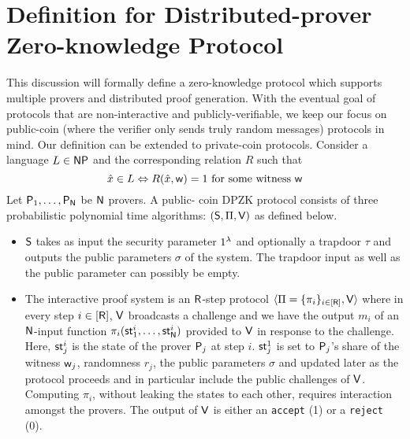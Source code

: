 \section{Definition for Distributed-prover Zero-knowledge Protocol}\label{sec:security model}
This discussion will formally define a zero-knowledge protocol which supports multiple provers and distributed proof generation. With the eventual goal of protocols that are non-interactive and publicly-verifiable,  we keep our focus on  public-coin (where the verifier only sends truly random messages) protocols in mind.  Our definition can be extended to private-coin protocols. Consider a language $L \in \mathsf{NP}$ and the corresponding relation $R$ such that
\[
\hat{x} \in L \Leftrightarrow R(\hat{x}, \mathsf{w})=1 \text{ for some witness } \mathsf{w}
\]
Let $\mathsf{P}_1, \ldots, \mathsf{P}_{\mathsf{N}}$ be $\mathsf{N}$ provers. %
A public- coin DPZK protocol consists of three probabilistic polynomial time algorithms: $(\mathsf{S}, \Pi, \mathsf{V})$ as defined below. 
\begin{itemize}
\item $\mathsf{S}$ takes as input the security parameter $1^{\lambda}$ and optionally a trapdoor $\tau$ and outputs the public parameters $\sigma$ of the system. The trapdoor input as well as the public parameter can possibly be empty.
\item The interactive proof system is an $\mathsf{R}$-step protocol $\langle \Pi = \{\pi_i\}_{i \in [\mathsf{R}]}, \mathsf{V} \rangle$ where in every step $i \in [\mathsf{R}]$,  $\mathsf{V}$ broadcasts a challenge and we have the output $m_i$ of an $\mathsf{N}$-input function $\pi_i(\mathsf{st}^i_1, \ldots, \mathsf{st}^i_{\mathsf{N}})$ provided to $\mathsf{V}$ in response to the challenge.   Here, $\mathsf{st}^i_j$ is the state of the prover $\mathsf{P}_j$ at step $i$. $\mathsf{st}^1_j$ is set to $\mathsf{P}_j$'s share of the witness $\mathsf{w}_j$, randomness $r_j$, the public parameters $\sigma$ and updated later as the protocol proceeds and in particular include the public challenges of $\mathsf{V}$.  Computing $\pi_i$, without leaking the states to each other, requires interaction amongst the provers. The output of $\mathsf{V}$ is either an {\tt accept} (1) or a {\tt reject} (0).%
\end{itemize}
